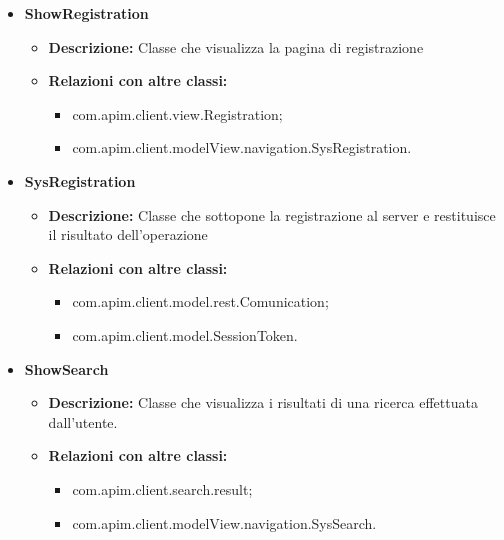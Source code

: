 {{{\begin{itemize}
\begin{itemize}
						\item \textbf{Relazioni con altre classi:}
							\begin{itemize}
								\item com.apim.client.model.rest.Comunication;
								\item com.apim.client.model.SessionToken.
							\end{itemize}
					\end{itemize}
				\item \textbf{ShowRegistration}
					\begin{itemize}
						\item \textbf{Descrizione:} Classe che visualizza la pagina di registrazione
						\item \textbf{Relazioni con altre classi:}
							\begin{itemize}
								\item com.apim.client.view.Registration;
								\item com.apim.client.modelView.navigation.SysRegistration.
							\end{itemize}
					\end{itemize}
				\item \textbf{SysRegistration}
					\begin{itemize}
						\item \textbf{Descrizione:} Classe che sottopone la registrazione al server e restituisce il risultato dell'operazione
						\item \textbf{Relazioni con altre classi:}
							\begin{itemize}
								\item com.apim.client.model.rest.Comunication;
								\item com.apim.client.model.SessionToken.
							\end{itemize}
					\end{itemize}
				\item \textbf{ShowSearch}
					\begin{itemize}
						\item \textbf{Descrizione:} Classe che visualizza i risultati di una ricerca effettuata dall'utente.
						\item \textbf{Relazioni con altre classi:}
							\begin{itemize}
								\item com.apim.client.search.result;
								\item com.apim.client.modelView.navigation.SysSearch.
							\end{itemize}

\end{itemize}
\end{itemize}}}}
